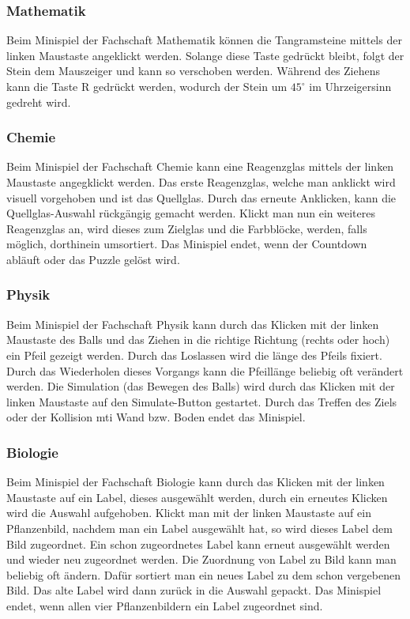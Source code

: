 \subsubsection{Mathematik}

Beim Minispiel der Fachschaft Mathematik können die Tangramsteine mittels der linken Maustaste angeklickt werden.
Solange diese Taste gedrückt bleibt, folgt der Stein dem Mauszeiger und kann so verschoben werden.
Während des Ziehens kann die Taste \glqq R \grqq{} gedrückt werden, wodurch der Stein um $45^\circ$ im Uhrzeigersinn gedreht wird.

\subsubsection{Chemie}

Beim Minispiel der Fachschaft Chemie kann eine Reagenzglas mittels der linken Maustaste angegklickt werden. Das erste Reagenzglas, welche man anklickt wird visuell vorgehoben und ist das Quellglas.
Durch das erneute Anklicken, kann die Quellglas-Auswahl rückgängig gemacht werden.
Klickt man nun ein weiteres Reagenzglas an, wird dieses zum Zielglas und die Farbblöcke, werden, falls möglich, dorthinein umsortiert.
Das Minispiel endet, wenn der Countdown abläuft oder das Puzzle gelöst wird.

\subsubsection{Physik}

Beim Minispiel der Fachschaft Physik kann durch das Klicken mit der linken Maustaste des Balls und das Ziehen in die richtige Richtung (rechts oder hoch) ein Pfeil gezeigt werden.
Durch das Loslassen wird die länge des Pfeils fixiert. Durch das Wiederholen dieses Vorgangs kann die Pfeillänge beliebig oft verändert werden.
Die Simulation (das Bewegen des Balls) wird durch das Klicken mit der linken Maustaste auf den Simulate-Button gestartet.
Durch das Treffen des Ziels oder der Kollision mti Wand bzw. Boden endet das Minispiel.

\subsubsection{Biologie}
Beim Minispiel der Fachschaft Biologie kann durch das Klicken mit der linken Maustaste auf ein Label, dieses ausgewählt werden, durch ein erneutes Klicken wird die Auswahl aufgehoben.
Klickt man mit der linken Maustaste auf ein Pflanzenbild, nachdem man ein Label ausgewählt hat, so wird dieses Label dem Bild zugeordnet. Ein schon zugeordnetes Label kann erneut ausgewählt werden und wieder neu zugeordnet werden.
Die Zuordnung von Label zu Bild kann man beliebig oft ändern. Dafür sortiert man ein neues Label zu dem schon vergebenen Bild. Das alte Label wird dann zurück in die Auswahl gepackt.
Das Minispiel endet, wenn allen vier Pflanzenbildern ein Label zugeordnet sind.

